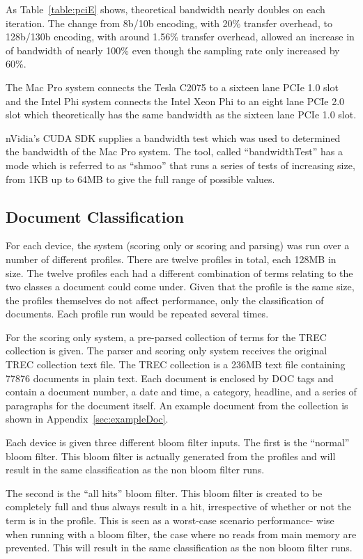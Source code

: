 As Table~\ref{table:pciE} shows, theoretical bandwidth nearly doubles on each
iteration. The change from 8b/10b encoding, with 20\% transfer overhead, to
128b/130b encoding, with around 1.56\% transfer overhead, allowed an increase in
of bandwidth of nearly 100\% even though the sampling rate only increased by
60\%.

The Mac Pro system connects the Tesla C2075 to a sixteen lane PCIe 1.0 slot and
the Intel Phi system connects the Intel Xeon Phi to an eight lane PCIe 2.0 slot
which theoretically has the same bandwidth as the sixteen lane PCIe 1.0 slot.

nVidia's CUDA SDK supplies a bandwidth test which was used to determined the
bandwidth of the Mac Pro system. The tool, called ``bandwidthTest'' has a mode
which is referred to as ``shmoo'' that runs a series of tests of increasing
size, from 1KB up to 64MB to give the full range of possible values.

\subsection{Document Classification}

For each device, the system (scoring only or scoring and parsing) was run over a
number of different profiles. There are twelve profiles in total, each 128MB in
size. The twelve profiles each had a different combination of terms relating to
the two classes a document could come under. Given that the profile is the same
size, the profiles themselves do not affect performance, only the classification
of documents. Each profile run would be repeated several times.

For the scoring only system, a pre-parsed collection of terms for the TREC
collection is given. The parser and scoring only system receives the original
TREC collection text file. The TREC collection is a 236MB text file containing
77876 documents in plain text. Each document is enclosed by DOC tags and
contain a document number, a date and time, a category, headline, and a series
of paragraphs for the document itself. An example document from the collection
is shown in Appendix~\ref{sec:exampleDoc}.

Each device is given three different bloom filter inputs. The first is the
``normal'' bloom filter. This bloom filter is actually generated from the
profiles and will result in the same classification as the non bloom filter
runs.

The second is the ``all hits'' bloom filter. This bloom filter is created to be
completely full and thus always result in a hit, irrespective of whether or not
the term is in the profile. This is seen as a worst-case scenario performance-
wise when running with a bloom filter, the case where no reads from main memory
are prevented. This will result in the same classification as the non bloom
filter runs.

